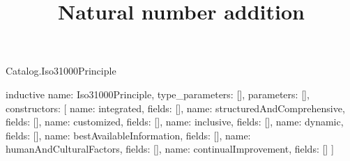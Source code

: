 \begin{lexlean}{Catalog.Iso31000Principle}
\title{Natural number addition}
\begin{semanticmodule}
inductive{
  name: Iso31000Principle,
  type_parameters: [],
  parameters: [],
  constructors: [
    {name: integrated, fields: []},
    {name: structuredAndComprehensive, fields: []},
    {name: customized, fields: []},
    {name: inclusive, fields: []},
    {name: dynamic, fields: []},
    {name: bestAvailableInformation, fields: []},
    {name: humanAndCulturalFactors, fields: []},
    {name: continualImprovement, fields: []}
  ]
}
\end{semanticmodule}
\end{lexlean}

